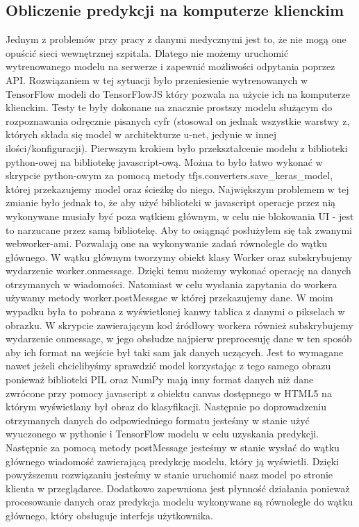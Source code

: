 \documentclass{article}
\begin{document}
\subsection{Obliczenie predykcji na komputerze klienckim}
Jednym z problemów przy pracy z danymi medycznymi jest to, że nie mogą one opuścić sieci wewnętrznej szpitala.
Dlatego nie możemy uruchomić wytrenowanego modelu na serwerze i zapewnić możliwości odpytania poprzez API.
Rozwiązaniem w tej sytuacji było przeniesienie wytrenowanych w TensorFlow modeli do TensorFlowJS który pozwala na użycie ich na komputerze klienckim.
Testy te były dokonane na znacznie prostszy modelu służącym do rozpoznawania odręcznie pisanych cyfr (stosował on jednak wszystkie warstwy z, których składa się model w architekturze u-net, jedynie w innej ilości/konfiguracji).
Pierwszym krokiem było przekształcenie modelu z biblioteki python-owej na bibliotekę javascript-ową.
Można to było łatwo wykonać w skrypcie python-owym za pomocą metody tfjs.converters.save\_keras\_model, której przekazujemy model oraz ścieżkę do niego.
Największym problemem w tej zmianie było jednak to, że aby użyć biblioteki w javascript operacje przez nią wykonywane musiały być poza wątkiem głównym, w celu nie blokowania UI - jest to narzucane przez samą bibliotekę.
Aby to osiągnąć posłużyłem się tak zwanymi webworker-ami.
Pozwalają one na wykonywanie zadań równolegle do wątku głównego.
W wątku głównym tworzymy obiekt klasy Worker oraz subskrybujemy wydarzenie worker.onmessage.
Dzięki temu możemy wykonać operację na danych otrzymanych w wiadomości. Natomiast w celu wysłania zapytania do workera używamy metody worker.postMessgae w której przekazujemy dane.
W moim wypadku była to pobrana z wyświetlonej kanwy tablica z danymi o pikselach w obrazku.
W skrypcie zawierającym kod źródłowy workera również subskrybujemy wydarzenie onmessage, w jego obsłudze najpierw preprocesuję dane w ten sposób aby ich format na wejście był taki sam jak danych uczących.
Jest to wymagane nawet jeżeli chcielibyśmy sprawdzić model korzystając z tego samego obrazu ponieważ biblioteki PIL oraz NumPy mają inny format danych niż dane zwrócone przy pomocy javascript z obiektu canvas dostępnego w HTML5 na którym wyświetlany był obraz do klasyfikacji.
Następnie po doprowadzeniu otrzymanych danych do odpowiedniego formatu jesteśmy w stanie użyć wyuczonego w pythonie i TensorFlow modelu w celu uzyskania predykcji.
Następnie za pomocą metody postMessage jesteśmy w stanie wysłać do wątku głównego wiadomość zawierającą predykcję modelu, który ją wyświetli.
Dzięki powyższemu rozwiązaniu jesteśmy w stanie uruchomić nasz model po stronie klienta w przeglądarce.
Dodatkowo zapewniona jest płynność działania ponieważ procesowanie danych oraz predykcja modelu wykonywane są równolegle do wątku głównego, który obsługuje interfejs użytkownika.
\newpage
\end{document}
